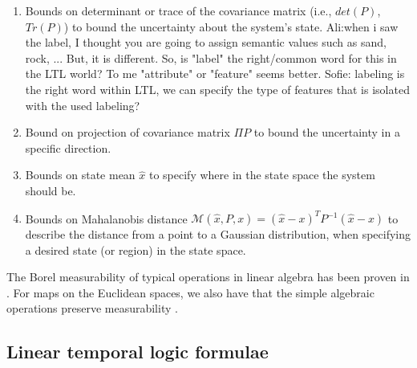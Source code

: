 \documentclass{ifacconf}
\newcommand{\red}[1]{{\color{red} #1}}
\renewcommand{\axx}[1]{{\color{orange} Ali:#1}}
\begin{document}
     \begin{enumerate}
 	\item Bounds on determinant or trace of the covariance matrix (i.e., $det(P)$, $Tr(P)$) to  bound the uncertainty about the system's state.
 	\axx{when i saw the label, I thought you are going to assign semantic values such as sand, rock, ... But, it is different. So, is "label" the right/common word for this in the LTL world? To me "attribute" or "feature" seems better. }\red{Sofie: labeling is the right word within LTL, we can specify  the type of features that is isolated with the used labeling?}
 	\item Bound on projection of covariance matrix $\Pi P$ to bound the uncertainty in a specific direction. 
    \item   Bounds on state mean $\hat{x}$ to specify
    where in the state space the system should be. 
    \item Bounds on Mahalanobis distance $\mathcal{M}(\hat{x},P,x) = (\hat{x}-x)^TP^{-1}(\hat{x}-x)$
    to describe the distance from a point to a Gaussian distribution, when specifying a desired state (or region) in the state space. 
    \end{enumerate}
 
    The Borel measurability of typical operations in linear algebra has been proven in \citep{azoff1974borel}.
For maps on the Euclidean spaces, we also have that the simple algebraic operations  preserve measurability \citep[page 116]{lang1993real}.
 
  
  
  
  \subsection{Linear temporal logic formulae}
    
\end{document}
